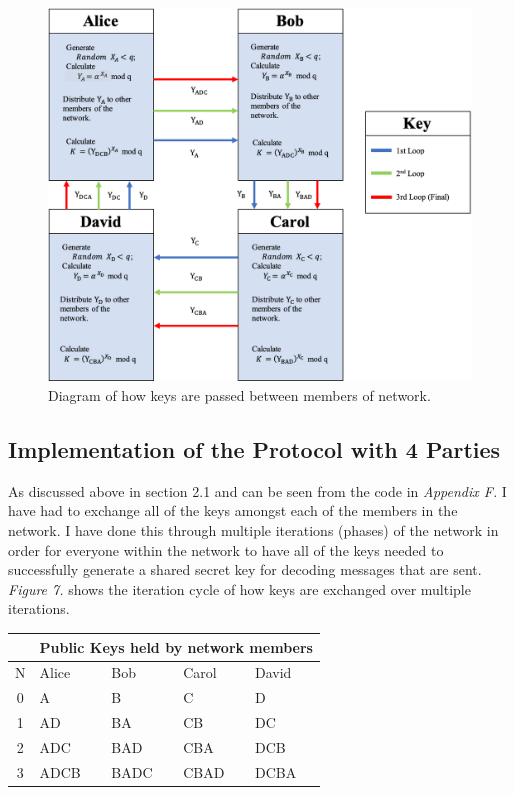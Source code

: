 \documentclass[a4paper, twoside, 11pt]{article}
\begin{document}
\begin{figure}[H]
	\centering
	\includegraphics[scale=0.6]{Images/keyExchange.png}
  \caption{Diagram of how keys are passed between members of network.}
\end{figure}


\subsection{Implementation of the Protocol with 4 Parties}
As discussed above in section 2.1 and can be seen from the code in \textit{Appendix F. } I have had to exchange all of the keys amongst each of the members in the network. I have done this through multiple iterations (phases) of the network in order
for everyone within the network to have all of the keys needed to successfully generate a shared secret key for decoding messages that are sent. 
\textit{Figure 7.} shows the iteration cycle of how keys are exchanged over multiple iterations.
\begin{center}
	\begin{tabular}{ |c|l|l|l|l| } 
	 \hline
	 \multicolumn{1}{|c|}{}& \multicolumn {4}{|c|}{Public Keys held by network members} \\
	 \hline
   N & Alice & Bob & Carol & David \\
   \hline
   0 & A & B & C & D \\
   1 & AD & BA & CB & DC \\
   2 & ADC & BAD & CBA & DCB \\
   3 & ADCB & BADC & CBAD & DCBA \\
	 \hline
  \end{tabular}
\end{center}
\pagebreak
\end{document}
